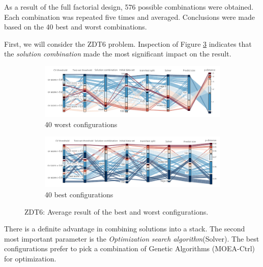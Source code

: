     As a result of the full factorial design, 576 possible combinations were obtained. Each combination was repeated five times and averaged. Conclusions were made based on the 40 best and worst combinations.

    First, we will consider the ZDT6 problem. Inspection of Figure \ref{fig:conf_zdt6} indicates that the \emph{solution combination} made the most significant impact on the result. 

            \begin{figure}[h!]
                \centering
                \begin{subfigure}{\textwidth}
                    \includegraphics[width=\textwidth]{content/images/conf_zdt6_worst}
                    \caption{40 worst configurations}
                    \label{fig:conf_zdt6_worst}
                \end{subfigure} 
                
                \begin{subfigure}{\textwidth}
                    \includegraphics[width=\textwidth]{content/images/conf_zdt6_best}
                    \caption{40 best configurations}
                    \label{fig:conf_zdt6_best}
                \end{subfigure}   
                \caption[ZDT6: Average result of the best and worst configurations.]{ZDT6: Average result of the best and worst configurations.}
                \label{fig:conf_zdt6}    
            \end{figure}
    There is a definite advantage in combining solutions into a stack. The second most important parameter is the \emph{Optimization search algorithm}(Solver). The best configurations prefer to pick a combination of Genetic Algorithms (MOEA-Ctrl) for optimization.
    

